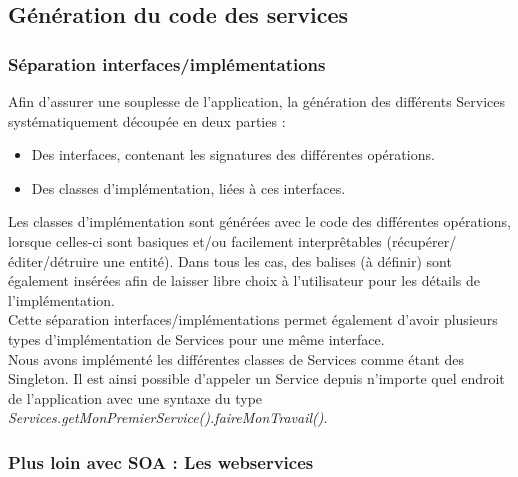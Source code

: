 
\subsection{Génération du code des services}

\subsubsection{Séparation interfaces/implémentations}

Afin d'assurer une souplesse de l'application, la génération des différents Services systématiquement découpée en deux parties :
\begin{itemize}
\item Des interfaces, contenant les signatures des différentes opérations.
\item Des classes d'implémentation, liées à ces interfaces.
\end{itemize}	

Les classes d'implémentation sont générées avec le code des différentes opérations, lorsque celles-ci sont basiques et/ou facilement interprêtables (récupérer/éditer/détruire une entité). Dans tous les cas, des balises  (à définir) sont également insérées afin de laisser libre choix à l'utilisateur pour les détails de l'implémentation.\\
Cette séparation interfaces/implémentations permet également d'avoir plusieurs types d'implémentation de Services pour une même interface.\\
Nous avons implémenté les différentes classes de Services comme étant des Singleton. Il est ainsi possible d'appeler un Service depuis n'importe quel endroit de l'application avec une syntaxe du type \textit{Services.getMonPremierService().faireMonTravail()}.

\subsubsection{Plus loin avec SOA : Les webservices}

